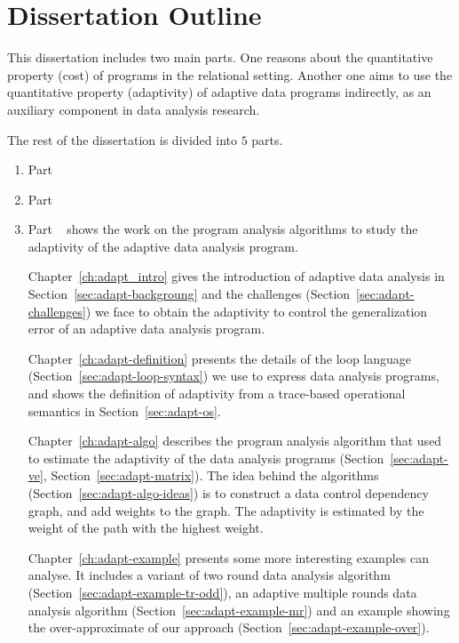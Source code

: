 \section{Dissertation Outline}
This dissertation includes two main parts. 
One reasons about the quantitative property (cost) of programs in the relational setting. Another one aims to use the quantitative property (adaptivity) of adaptive data programs indirectly, as an auxiliary component in data analysis research.

The rest of the dissertation is divided into $5$ parts. 
\begin{enumerate}
    \item Part ~ 
    
    \item Part ~
    
    \item Part ~{\ADAPTSYSTEM} shows the work on the program analysis algorithms to study the adaptivity of the adaptive data analysis program.    

Chapter~\ref{ch:adapt_intro} gives the introduction of adaptive data analysis in Section~\ref{sec:adapt-backgroung} and the challenges (Section~\ref{sec:adapt-challenges}) we face to obtain the adaptivity to control the generalization error of an adaptive data analysis program.

Chapter~\ref{ch:adapt-definition} presents the details of the loop language (Section~\ref{sec:adapt-loop-syntax}) we use to express data analysis programs, and shows the definition of adaptivity from a trace-based operational semantics in Section~\ref{sec:adapt-os}. 


Chapter~\ref{ch:adapt-algo} describes the program analysis algorithm {\ADAPTSYSTEM} that used to estimate the adaptivity of the data analysis programs (Section~\ref{sec:adapt-ve}, Section~\ref{sec:adapt-matrix}). 
The idea behind the algorithms (Section~\ref{sec:adapt-algo-ideas}) is to construct a data control dependency graph, and add weights to the graph. The adaptivity is estimated by the weight of the path with the highest weight.

Chapter~\ref{ch:adapt-example} presents some more interesting examples {\ADAPTSYSTEM} can analyse. 
It includes a variant of two round data analysis algorithm (Section~\ref{sec:adapt-example-tr-odd}), 
an adaptive multiple rounds data analysis algorithm (Section~\ref{sec:adapt-example-mr}) and an example showing the over-approximate of our approach (Section~\ref{sec:adapt-example-over}). 


\end{enumerate}

